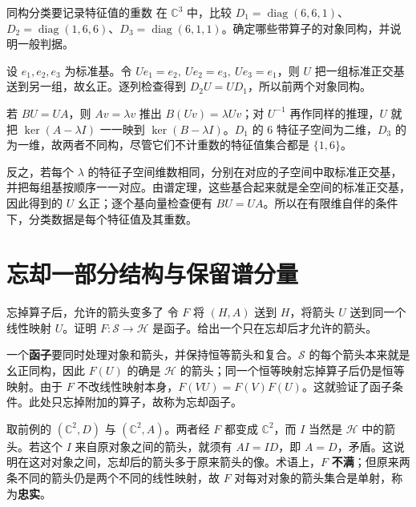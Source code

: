 \begin{example}{同构分类要记录特征值的重数}
在 $\mathbb C^3$ 中，比较 $D_1=\operatorname{diag}(6,6,1)$、$D_2=\operatorname{diag}(1,6,6)$、$D_3=\operatorname{diag}(6,1,1)$。确定哪些带算子的对象同构，并说明一般判据。
\end{example}
\begin{solution}
设 $e_1,e_2,e_3$ 为标准基。令 $Ue_1=e_2,\ Ue_2=e_3,\ Ue_3=e_1$，则 $U$ 把一组标准正交基送到另一组，故幺正。逐列检查得到 $D_2U=UD_1$，所以前两个对象同构。

若 $BU=UA$，则 $Av=\lambda v$ 推出 $B(Uv)=\lambda Uv$；对 $U^{-1}$ 再作同样的推理，$U$ 就把 $\ker(A-\lambda I)$ 一一映到 $\ker(B-\lambda I)$。$D_1$ 的 $6$ 特征子空间为二维，$D_3$ 的为一维，故两者不同构，尽管它们不计重数的特征值集合都是 $\{1,6\}$。

反之，若每个 $\lambda$ 的特征子空间维数相同，分别在对应的子空间中取标准正交基，并把每组基按顺序一一对应。由谱定理，这些基合起来就是全空间的标准正交基，因此得到的 $U$ 幺正；逐个基向量检查便有 $BU=UA$。所以在有限维自伴的条件下，分类数据是每个特征值及其重数。
\end{solution}

\section{忘却一部分结构与保留谱分量}

\begin{example}{忘掉算子后，允许的箭头变多了}
令 $F$ 将 $(H,A)$ 送到 $H$，将箭头 $U$ 送到同一个线性映射 $U$。证明 $F:\mathcal S\to\mathcal H$ 是函子。给出一个只在忘却后才允许的箭头。
\end{example}
\begin{solution}
一个\textbf{函子}要同时处理对象和箭头，并保持恒等箭头和复合。$\mathcal S$ 的每个箭头本来就是幺正同构，因此 $F(U)$ 的确是 $\mathcal H$ 的箭头；同一个恒等映射忘掉算子后仍是恒等映射。由于 $F$ 不改线性映射本身，$F(VU)=F(V)F(U)$。这就验证了函子条件。此处只忘掉附加的算子，故称为忘却函子。

取前例的 $(\mathbb C^2,D)$ 与 $(\mathbb C^2,A)$。两者经 $F$ 都变成 $\mathbb C^2$，而 $I$ 当然是 $\mathcal H$ 中的箭头。若这个 $I$ 来自原对象之间的箭头，就须有 $AI=ID$，即 $A=D$，矛盾。这说明在这对对象之间，忘却后的箭头多于原来箭头的像。术语上，$F$ \textbf{不满}；但原来两条不同的箭头仍是两个不同的线性映射，故 $F$ 对每对对象的箭头集合是单射，称为\textbf{忠实}。
\end{solution}

